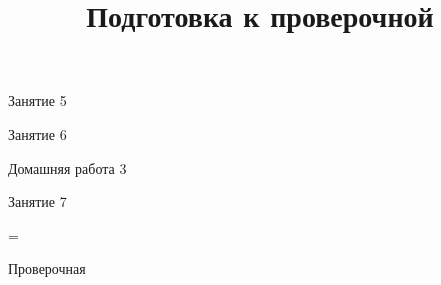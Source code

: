 \begin{class}[number=5]
	\begin{listofex}
		\item Занятие 5
	\end{listofex}
\end{class}

\begin{class}[number=6]
	\begin{listofex}
		\item Занятие 6
	\end{listofex}
\end{class}

\begin{homework}[number=3]
	\begin{listofex}
		\item Домашняя работа 3
	\end{listofex}
\end{homework}

\begin{class}[number=7]
	\title{Подготовка к проверочной}
	\begin{listofex}
		\item Занятие 7
	\end{listofex}
\end{class}

=%
\begin{exam}
	\begin{listofex}
		\item Проверочная
	\end{listofex}
\end{exam}

